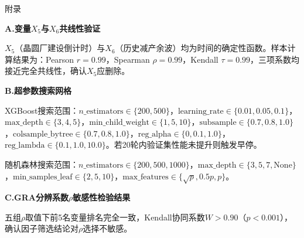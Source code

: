 \documentclass[a4paper,12pt,fontset=fandol]{ctexart}
\begin{document}
\newpage
{}
{}
\begin{center}
{\heiti{} 附录}
\end{center}
\vspace{6pt}

\noindent\textbf{A.\;变量$X_5$与$X_6$共线性验证}

$X_5$（晶圆厂建设倒计时）与$X_6$（历史减产余波）均为时间的确定性函数。样本计算结果为：Pearson $r=0.99$，Spearman $\rho=0.99$，Kendall $\tau=0.99$，三项系数均接近完全共线性，确认$X_5$应删除。

\vspace{12pt}
\noindent\textbf{B.\;超参数搜索网格}

XGBoost搜索范围：$n\_\text{estimators}\in\{200,500\}$，$\text{learning\_rate}\in\{0.01,0.05,0.1\}$，$\text{max\_depth}\in\{3,4,5\}$，$\text{min\_child\_weight}\in\{1,5,10\}$，$\text{subsample}\in\{0.7,0.8,1.0\}$，$\text{colsample\_bytree}\in\{0.7,0.8,1.0\}$，$\text{reg\_alpha}\in\{0,0.1,1.0\}$，$\text{reg\_lambda}\in\{0.1,1.0,10.0\}$。若20轮内验证集性能未提升则触发早停。

随机森林搜索范围：$n\_\text{estimators}\in\{200,500,1000\}$，$\text{max\_depth}\in\{3,5,7,\text{None}\}$，$\text{min\_samples\_leaf}\in\{2,5,10\}$，$\text{max\_features}\in\{\sqrt{p},0.5p,p\}$。

\vspace{12pt}
\noindent\textbf{C.\;GRA分辨系数$\rho$敏感性检验结果}

五组$\rho$取值下前5名变量排名完全一致，Kendall协同系数$W>0.90$（$p<0.001$），确认因子筛选结论对$\rho$选择不敏感。
\end{document}
